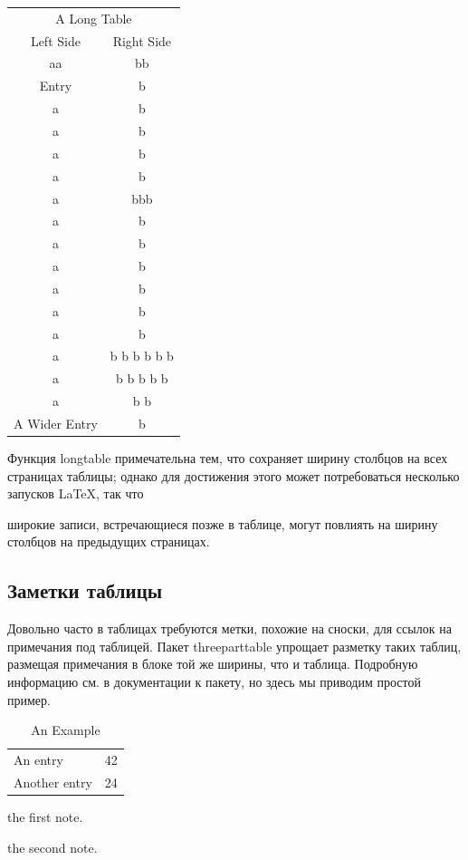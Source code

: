 \documentclass{article}
\begin{document}
  \begin{longtable}{cc}
  \multicolumn{2}{c}{A Long Table}\\
    Left Side & Right Side\\
  \hline
  \endhead
  \hline
  \endfoot
    aa & bb\\
    Entry & b\\
    a & b\\
    a & b\\
    a & b\\
    a & b\\
    a & bbb\\
    a & b\\
    a & b\\
    a & b\\
    a & b\\
    a & b\\
    a & b\\
    a & b b b b b b\\
    a & b b b b b\\
    a & b b\\
    A Wider Entry & b\\
\end{longtable}


  \smallskip

  Функция longtable примечательна тем, что сохраняет ширину столбцов на всех страницах
таблицы; однако для достижения этого может потребоваться несколько запусков LaTeX, так что

широкие записи, встречающиеся позже в таблице, могут повлиять на ширину столбцов на предыдущих
страницах.





  \subsection{Заметки таблицы}
  \label{subsec:width}
  
  Довольно часто в таблицах требуются метки, похожие на сноски, для ссылок на примечания под таблицей. Пакет threeparttable упрощает разметку таких таблиц,
  размещая примечания в блоке той же ширины, что и таблица. Подробную информацию см. в документации к пакету, но здесь мы приводим простой пример.


  \smallskip

  \begin{table}
  \begin{threeparttable}
  \caption{An Example}
  \begin{tabular}{ll}
    An entry & 42\tnote{1}\\
    Another entry & 24\tnote{2}\\
  \end{tabular}
  \begin{tablenotes}
  \item [1] the first note.
  \item [2] the second note.
  \end{tablenotes}
  \end{threeparttable}
  \end{table}
\end{document}
